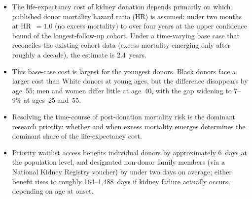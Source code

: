 \begin{itemize}
	\item The life-expectancy cost of kidney donation depends primarily on which published donor mortality hazard ratio (HR) is assumed: under two months at HR~$=1.0$ (no excess mortality) to over four years at the upper confidence bound of the longest-follow-up cohort. Under a time-varying base case that reconciles the existing cohort data (excess mortality emerging only after roughly a decade), the estimate is 2.4~years.
	\item This base-case cost is largest for the youngest donors. Black donors face a larger cost than White donors at young ages, but the difference disappears by age~55; men and women differ little at age~40, with the gap widening to 7--9\% at ages~25 and~55.
	\item Resolving the time-course of post-donation mortality risk is the dominant research priority: whether and when excess mortality emerges determines the dominant share of the life-expectancy cost.
	\item Priority waitlist access benefits individual donors by approximately 6~days at the population level, and designated non-donor family members (via a National Kidney Registry voucher) by under two days on average; either benefit rises to roughly 164--1{,}488~days if kidney failure actually occurs, depending on age at onset.
\end{itemize}
